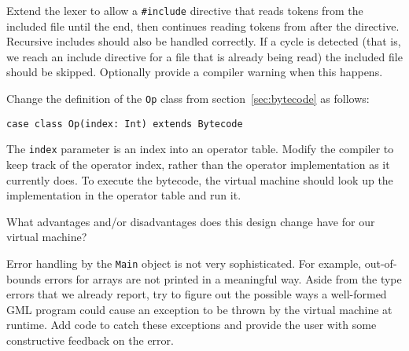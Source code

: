 \begin{samepage}
\ex
Extend the lexer to allow a \verb!#include! directive
that reads tokens from the included file until the end,
then continues reading tokens from after the directive.
Recursive includes should also be handled correctly.
If a cycle is detected
(that is, we reach an include directive for a file that is already being read)
the included file should be skipped.
Optionally provide a compiler warning when this happens.
\end{samepage}

\begin{samepage}
\ex
Change
the definition of the \verb!Op! class from section~\ref{sec:bytecode}
as follows:
\begin{verbatim}
case class Op(index: Int) extends Bytecode
\end{verbatim}
The \verb!index! parameter is an index into an operator table.
Modify the compiler to keep track of the operator index,
rather than the operator implementation as it currently does.
To execute the bytecode,
the virtual machine should look up the implementation in the operator table
and run it.

What advantages and/or disadvantages
does this design change have for our virtual machine?
\end{samepage}

\begin{samepage}
\ex
Error handling by the \verb!Main! object is not very sophisticated.
For example,
out-of-bounds errors for arrays are not printed in a meaningful way.
Aside from the type errors that we already report,
try to figure out the possible ways a well-formed GML program
could cause an exception to be thrown by the virtual machine at runtime.
Add code to catch these exceptions
and provide the user with some constructive feedback on the error.
\end{samepage}

% 

